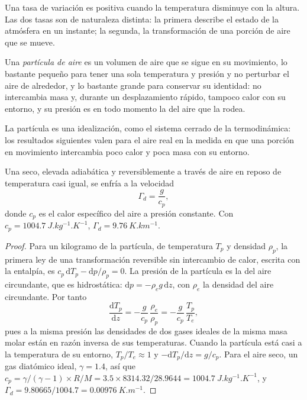 Una tasa de variación es positiva cuando la temperatura disminuye con la altura. Las dos tasas son de naturaleza distinta: la primera describe el estado de la atmósfera en un instante; la segunda, la transformación de una porción de aire que se mueve.

\begin{definition}\label{def:b1:fluid-envelopes-structure:parcel}
Una \emph{partícula de aire} es un volumen de aire que se sigue en su movimiento, lo bastante pequeño para tener una sola temperatura y presión y no perturbar el aire de alrededor, y lo bastante grande para conservar su identidad: no intercambia masa y, durante un desplazamiento rápido, tampoco calor con su entorno, y su presión es en todo momento la del aire que la rodea.
\end{definition}

La partícula es una idealización, como el sistema cerrado de la termodinámica: los resultados siguientes valen para el aire real en la medida en que una porción en movimiento intercambia poco calor y poca masa con su entorno.

\begin{theorem}\label{thm:b1:fluid-envelopes-structure:dry-adiabatic}
Una  seco, elevada adiabática y reversiblemente a través de aire en reposo de temperatura casi igual, se enfría a la velocidad
\[
  \Gamma_d = \frac{g}{c_p},
\]
donde $c_p$ es el calor específico del aire a presión constante. Con $c_p =
\qty{1004.7}{J.kg^{-1}.K^{-1}}$, $\Gamma_d = \qty{9.76}{K.km^{-1}}$.
\end{theorem}

\begin{proof}
Para un kilogramo de la partícula, de temperatura $T_p$ y densidad $\rho_p$, la primera ley de una transformación reversible sin intercambio de calor, escrita con la entalpía, es $c_p\,\mathrm dT_p - \mathrm dp/\rho_p = 0$. La presión de la partícula es la del aire circundante, que es hidrostática: $\mathrm dp = -\rho_e
g\,\mathrm dz$, con $\rho_e$ la densidad del aire circundante. Por tanto
\[
  \frac{\mathrm dT_p}{\mathrm dz} = -\frac{g}{c_p}\,\frac{\rho_e}{\rho_p}
  = -\frac{g}{c_p}\,\frac{T_p}{T_e},
\]
pues a la misma presión las densidades de dos gases ideales de la misma masa molar
están en razón inversa de sus temperaturas. Cuando la partícula está casi a la temperatura de su entorno, $T_p/T_e \approx 1$ y $-\mathrm dT_p/\mathrm dz
= g/c_p$. Para el aire seco, un gas diatómico ideal, $\gamma = 1.4$, así que $c_p =
\gamma/(\gamma - 1) \times R/M = 3.5 \times 8314.32/28.9644 =
\qty{1004.7}{J.kg^{-1}.K^{-1}}$, y $\Gamma_d = 9.80665/1004.7 =
\qty{0.00976}{K.m^{-1}}$.
\end{proof}

